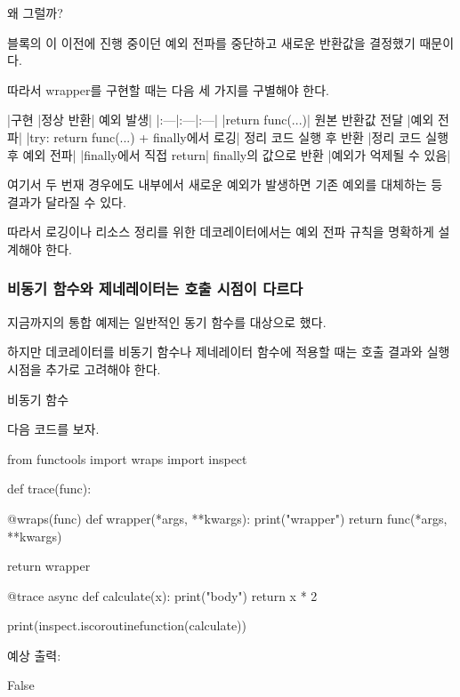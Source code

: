 왜 그럴까?

 블록의 이 이전에 진행 중이던 예외 전파를 중단하고 새로운 반환값을 결정했기 때문이다.

따라서 wrapper를 구현할 때는 다음 세 가지를 구별해야 한다.

\begin{dhktable}
|구현	|정상 반환|	예외 발생|
|:---|:---|:---|
|return func(...)|	원본 반환값 전달	|예외 전파|
|try: return func(...) + finally에서 로깅|	정리 코드 실행 후 반환	|정리 코드 실행 후 예외 전파|
|finally에서 직접 return|	finally의 값으로 반환	|예외가 억제될 수 있음|
\end{dhktable}

여기서 두 번재 경우에도  내부에서 새로운 예외가 발생하면 기존 예외를 대체하는 등 결과가 달라질 수 있다.

따라서 로깅이나 리소스 정리를 위한 데코레이터에서는 예외 전파 규칙을 명확하게 설계해야 한다.

\subsubsection{비동기 함수와 제네레이터는 호출 시점이 다르다}

지금까지의 통합 예제는 일반적인 동기 함수를 대상으로 했다.

하지만 데코레이터를 비동기 함수나 제네레이터 함수에 적용할 때는 호출 결과와 실행 시점을 추가로 고려해야 한다.

\begin{dhknote}
\begin{dhksmry}[centered]
비동기 함수
\end{dhksmry}
\end{dhknote}

다음 코드를 보자.

\begin{dhkcode}
from functools import wraps
import inspect


def trace(func):

    @wraps(func)
    def wrapper(*args, **kwargs):
        print("wrapper")
        return func(*args, **kwargs)

    return wrapper


@trace
async def calculate(x):
    print("body")
    return x * 2


print(inspect.iscoroutinefunction(calculate))
\end{dhkcode}

예상 출력:

\begin{dhkzsh}
False
\end{dhkzsh}

